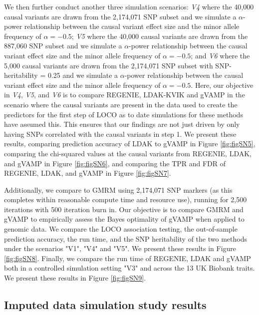 We then further conduct another three simulation scenarios: \emph{V4} where the 40,000 causal variants are drawn from the 2,174,071 SNP subset and we simulate a $\alpha$-power relationship between the causal variant effect size and the minor allele frequency of $\alpha = -0.5$; \emph{V5} where the 40,000 causal variants are drawn from the 887,060 SNP subset and we simulate a $\alpha$-power relationship between the causal variant effect size and the minor allele frequency of $\alpha = -0.5$; and \emph{V6} where the 5,000 causal variants are drawn from the 2,174,071 SNP subset with SNP-heritability = 0.25 and we simulate a $\alpha$-power relationship between the causal variant effect size and the minor allele frequency of $\alpha = -0.5$. Here, our objective in \emph{V4}, \emph{V5}, and \emph{V6} is to compare REGENIE, LDAK-KVIK and gVAMP in the scenario where the causal variants are present in the data used to create the predictors for the first step of LOCO as to date simulations for these methods have assumed this. This ensures that our findings are not just driven by only having SNPs correlated with the causal variants in step 1. We present these results, comparing prediction accuracy of LDAK to gVAMP in Figure \ref{fig:figSN5}, comparing the chi-squared values at the causal variants from REGENIE, LDAK, and gVAMP in Figure \ref{fig:figSN6}, and comparing the TPR and FDR of REGENIE, LDAK, and gVAMP in Figure \ref{fig:figSN7}. 

Additionally, we compare to GMRM using 2,174,071 SNP markers (as this completes within reasonable compute time and resource use), running for 2,500 iterations with 500 iteration burn in. Our objective is to compare GMRM and gVAMP to empirically assess the Bayes optimality of gVAMP when applied to genomic data. We compare the LOCO association testing, the out-of-sample prediction accuracy, the run time, and the SNP heritability of the two methods under the scenarios "V1", "V4" and "V5". We present these results in Figure \ref{fig:figSN8}. Finally, we compare the run time of REGENIE, LDAK and gVAMP both in a controlled simulation setting "V3" and across the 13 UK Biobank traits. We present these results in Figure \ref{fig:figSN9}.

\subsection*{Imputed data simulation study results}

